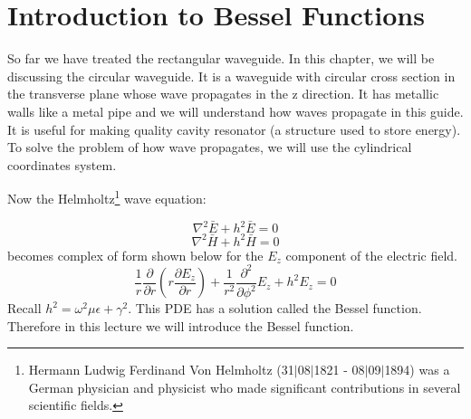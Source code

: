 \chapter{Introduction to Bessel Functions}
So far we have treated the rectangular waveguide. In this chapter, we will be discussing the circular waveguide. It is a waveguide with circular cross section in the transverse plane whose wave propagates in the z direction. It has metallic walls like a metal pipe and we will understand how waves propagate in this guide. It is useful for making quality cavity resonator (a structure used to store energy). To solve the problem of how wave propagates, we will use the cylindrical coordinates system.

Now the Helmholtz\footnote{Hermann Ludwig Ferdinand Von Helmholtz (31$|$08$|$1821 - 08$|$09$|$1894) was a German physician and physicist who made significant contributions in several scientific fields.}  wave equation:

$$\nabla^2 \bar{E} + h^2 \bar{E} = 0 $$
$$\nabla^2 \bar{H} + h^2 \bar{H} = 0 $$
becomes complex of form shown below for the $E_z$ component of the electric field.
$$\frac{1}{r} \frac{\partial}{\partial r} (r \frac{\partial E_z}{\partial r}) + \frac{1}{r^2} \frac{\partial^2}{\partial \phi ^2}E_z + h^2 E_z = 0 $$
Recall $h^2 = \omega^2 \mu \epsilon + \gamma^2$. This PDE has a solution called the Bessel function. Therefore in this lecture we will introduce the Bessel function.

